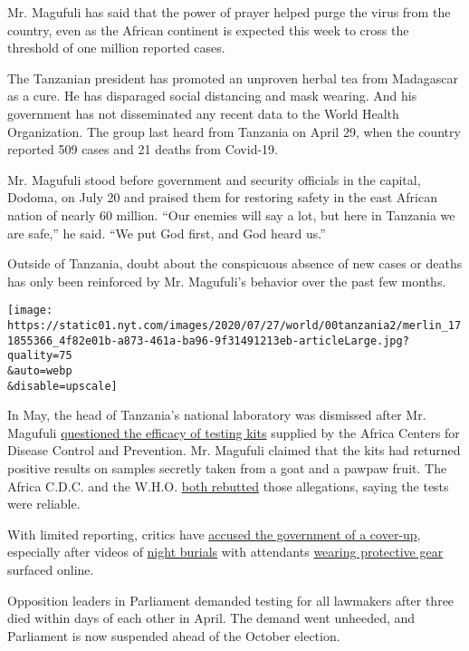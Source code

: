 Mr. Magufuli has said that the power of prayer helped purge the virus
from the country, even as the African continent is expected this week to
cross the threshold of one million reported cases.

The Tanzanian president has promoted an unproven herbal tea from
Madagascar as a cure. He has disparaged social distancing and mask
wearing. And his government has not disseminated any recent data to the
World Health Organization. The group last heard from Tanzania on April
29, when the country reported 509 cases and 21 deaths from Covid-19.

Mr. Magufuli stood before government and security officials in the
capital, Dodoma, on July 20 and praised them for restoring safety in the
east African nation of nearly 60 million. ``Our enemies will say a lot,
but here in Tanzania we are safe,'' he said. ``We put God first, and God
heard us.''

Outside of Tanzania, doubt about the conspicuous absence of new cases or
deaths has only been reinforced by Mr. Magufuli's behavior over the past
few months.

\texttt{[image: https://static01.nyt.com/images/2020/07/27/world/00tanzania2/merlin\_171855366\_4f82e01b-a873-461a-ba96-9f31491213eb-articleLarge.jpg?quality=75\\\&auto=webp\\\&disable=upscale]}

In May, the head of Tanzania's national laboratory was dismissed after
Mr. Magufuli
\href{https://www.youtube.com/watch?v=DbSZd8oyaGE}{questioned the
efficacy of testing kits} supplied by the Africa Centers for Disease
Control and Prevention. Mr. Magufuli claimed that the kits had returned
positive results on samples secretly taken from a goat and a pawpaw
fruit. The Africa C.D.C. and the W.H.O.
\href{https://www.youtube.com/watch?time_continue=3\&v=cwrW2Ksg-6Q\&feature=emb_logo}{both
rebutted} those allegations, saying the tests were reliable.

With limited reporting, critics have
\href{https://medium.com/@actbrief/president-magufuli-must-commit-to-full-transparency-334919f76260}{accused
the government of a cover-up}, especially after videos of
\href{https://twitter.com/fatma_karume/status/1254657286179520517}{night
burials} with attendants
\href{https://twitter.com/ngurumo/status/1255204084182810629}{wearing
protective gear} surfaced online.

Opposition leaders in Parliament demanded testing for all lawmakers
after three died within days of each other in April. The demand went
unheeded, and Parliament is now suspended ahead of the October election.

